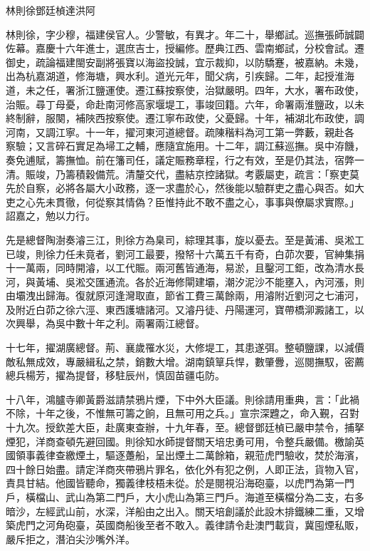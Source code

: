 
\begin{pinyinscope}
林則徐鄧廷楨達洪阿

林則徐，字少穆，福建侯官人。少警敏，有異才。年二十，舉鄉試。巡撫張師誠闢佐幕。嘉慶十六年進士，選庶吉士，授編修。歷典江西、雲南鄉試，分校會試。遷御史，疏論福建閩安副將張寶以海盜投誠，宜示裁抑，以防驕蹇，被嘉納。未幾，出為杭嘉湖道，修海塘，興水利。道光元年，聞父病，引疾歸。二年，起授淮海道，未之任，署浙江鹽運使。遷江蘇按察使，治獄嚴明。四年，大水，署布政使，治賑。尋丁母憂，命赴南河修高家堰堤工，事竣回籍。六年，命署兩淮鹽政，以未終制辭，服闋，補陜西按察使。遷江寧布政使，父憂歸。十年，補湖北布政使，調河南，又調江寧。十一年，擢河東河道總督。疏陳稭料為河工第一弊藪，親赴各察驗；又言碎石實足為埽工之輔，應隨宜施用。十二年，調江蘇巡撫。吳中洊饑，奏免逋賦，籌撫恤。前在籓司任，議定賑務章程，行之有效，至是仍其法，宿弊一清。賑竣，乃籌積穀備荒。清釐交代，盡結京控諸獄。考覈屬吏，疏言：「察吏莫先於自察，必將各屬大小政務，逐一求盡於心，然後能以驗群吏之盡心與否。如大吏之心先未貫徹，何從察其情偽？臣惟持此不敢不盡之心，事事與僚屬求實際。」詔嘉之，勉以力行。

先是總督陶澍奏濬三江，則徐方為臬司，綜理其事，旋以憂去。至是黃浦、吳淞工已竣，則徐力任未竟者，劉河工最要，撥帑十六萬五千有奇，白茆次要，官紳集捐十一萬兩，同時開濬，以工代賑。兩河舊皆通海，易淤，且鑿河工鉅，改為清水長河，與黃埔、吳淞交匯通流。各於近海修閘建壩，潮汐泥沙不能壅入，內河漲，則由壩洩出歸海。復就原河逢灣取直，節省工費三萬餘兩，用濬附近劉河之七浦河，及附近白茆之徐六涇、東西護塘諸河。又濬丹徒、丹陽運河，寶帶橋泖澱諸工，以次興舉，為吳中數十年之利。兩署兩江總督。

十七年，擢湖廣總督。荊、襄歲罹水災，大修堤工，其患遂弭。整頓鹽課，以減價敵私無成效，專嚴緝私之禁，銷數大增。湖南鎮筸兵悍，數肇釁，巡閱撫馭，密薦總兵楊芳，擢為提督，移駐辰州，慎固苗疆屯防。

十八年，鴻臚寺卿黃爵滋請禁鴉片煙，下中外大臣議。則徐請用重典，言：「此禍不除，十年之後，不惟無可籌之餉，且無可用之兵。」宣宗深韙之，命入覲，召對十九次。授欽差大臣，赴廣東查辦，十九年春，至。總督鄧廷楨已嚴申禁令，捕拏煙犯，洋商查頓先避回國。則徐知水師提督關天培忠勇可用，令整兵嚴備。檄諭英國領事義律查繳煙土，驅逐躉船，呈出煙土二萬餘箱，親蒞虎門驗收，焚於海濱，四十餘日始盡。請定洋商夾帶鴉片罪名，依化外有犯之例，人即正法，貨物入官，責具甘結。他國皆聽命，獨義律枝梧未從。於是閱視沿海砲臺，以虎門為第一門戶，橫檔山、武山為第二門戶，大小虎山為第三門戶。海道至橫檔分為二支，右多暗沙，左經武山前，水深，洋船由之出入。關天培創議於此設木排鐵練二重，又增築虎門之河角砲臺，英國商船後至者不敢入。義律請令赴澳門載貨，冀囤煙私販，嚴斥拒之，潛泊尖沙嘴外洋。


\end{pinyinscope}
